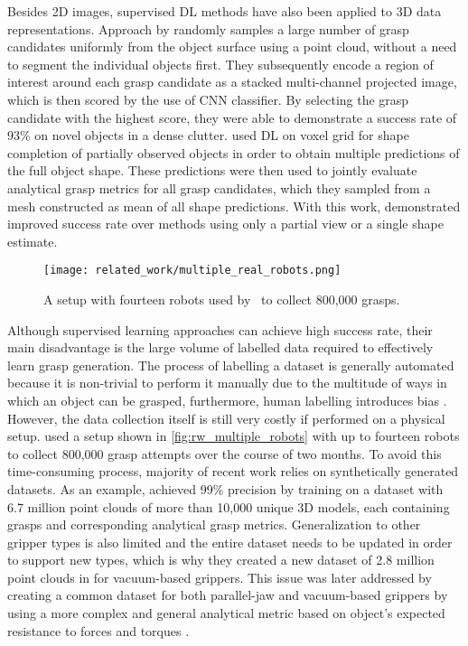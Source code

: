 Besides 2D images, supervised DL methods have also been applied to 3D data representations. Approach by \citet{ten_pas_grasp_2017} randomly samples a large number of grasp candidates uniformly from the object surface using a point cloud, without a need to segment the individual objects first. They subsequently encode a region of interest around each grasp candidate as a stacked multi-channel projected image, which is then scored by the use of CNN classifier. By selecting the grasp candidate with the highest score, they were able to demonstrate a success rate of 93\% on novel objects in a dense clutter. \citet{lundell_robust_2019} used DL on voxel grid for shape completion of partially observed objects in order to obtain multiple predictions of the full object shape. These predictions were then used to jointly evaluate analytical grasp metrics for all grasp candidates, which they sampled from a mesh constructed as mean of all shape predictions. With this work, \citeauthor{lundell_robust_2019} demonstrated improved success rate over methods using only a partial view or a single shape estimate.

\begin{figure}[b]
    \centering
    \texttt{[image: related\_work/multiple\_real\_robots.png]}
    \caption{A setup with fourteen robots used by~\protect\citet{levine_learning_2016} to collect 800,000 grasps.}
    \label{fig:rw_multiple_robots}
\end{figure}

Although supervised learning approaches can achieve high success rate, their main disadvantage is the large volume of labelled data required to effectively learn grasp generation. The process of labelling a dataset is generally automated because it is non-trivial to perform it manually due to the multitude of ways in which an object can be grasped, furthermore, human labelling introduces bias \cite{pinto_supersizing_2015}. However, the data collection itself is still very costly if performed on a physical setup. \citet{levine_learning_2016} used a setup shown in \autoref{fig:rw_multiple_robots} with up to fourteen robots to collect 800,000 grasp attempts over the course of two months. To avoid this time-consuming process, majority of recent work relies on synthetically generated datasets. As an example, \citet{mahler_dex-net_2017} achieved 99\% precision by training on a dataset with 6.7 million point clouds of more than 10,000 unique 3D models, each containing grasps and corresponding analytical grasp metrics. Generalization to other gripper types is also limited and the entire dataset needs to be updated in order to support new types, which is why they created a new dataset of 2.8 million point clouds in \citeyear{mahler_dex-net_2018} for vacuum-based grippers. This issue was later addressed by creating a common dataset for both parallel-jaw and vacuum-based grippers by using a more complex and general analytical metric based on object's expected resistance to forces and torques \cite{mahler_learning_2019}.


